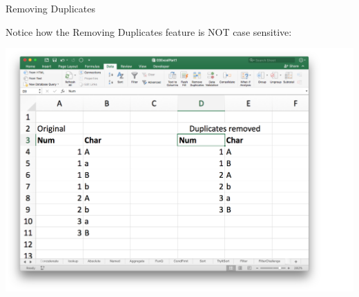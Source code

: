 \documentclass[xcolor=svgnames]{beamer}
\begin{document}
\begin{frame}{Removing Duplicates}


Notice how the Removing Duplicates feature is NOT case sensitive:
\begin{center}
 \includegraphics[width=.7\textwidth]{rmDup2}
\end{center}



\end{frame}
\end{document}
